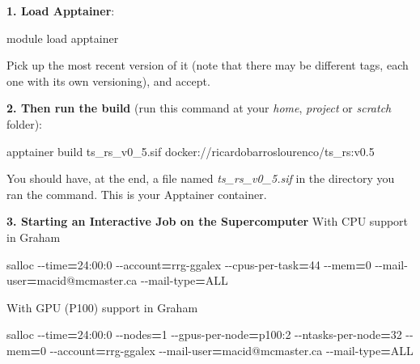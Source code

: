 \documentclass[
]{book}
\newenvironment{Shaded}{\begin{snugshade}}{\end{snugshade}}
\newcommand{\AttributeTok}[1]{\textcolor[rgb]{0.13,0.29,0.53}{#1}}
\newcommand{\ExtensionTok}[1]{#1}
\newcommand{\NormalTok}[1]{#1}
\newcommand{\OperatorTok}[1]{\textcolor[rgb]{0.81,0.36,0.00}{\textbf{#1}}}
\begin{document}
\textbf{1. Load Apptainer}:

\begin{Shaded}
\begin{Highlighting}[]
\ExtensionTok{module}\NormalTok{ load apptainer}
\end{Highlighting}
\end{Shaded}

Pick up the most recent version of it (note that there may be different tags, each one with its own versioning), and accept.

\textbf{2. Then run the build} (run this command at your \emph{home}, \emph{project} or \emph{scratch} folder):

\begin{Shaded}
\begin{Highlighting}[]
\ExtensionTok{apptainer}\NormalTok{ build ts\_rs\_v0\_5.sif docker://ricardobarroslourenco/ts\_rs:v0.5}
\end{Highlighting}
\end{Shaded}

You should have, at the end, a file named \emph{ts\_rs\_v0\_5.sif} in the
directory you ran the command. This is your Apptainer container.

\textbf{3. Starting an Interactive Job on the Supercomputer}
With CPU support in Graham

\begin{Shaded}
\begin{Highlighting}[]
\ExtensionTok{salloc} \AttributeTok{{-}{-}time}\OperatorTok{=}\NormalTok{24:00:0 }\AttributeTok{{-}{-}account}\OperatorTok{=}\NormalTok{rrg{-}ggalex }\AttributeTok{{-}{-}cpus{-}per{-}task}\OperatorTok{=}\NormalTok{44 }\AttributeTok{{-}{-}mem}\OperatorTok{=}\NormalTok{0 }\AttributeTok{{-}{-}mail{-}user}\OperatorTok{=}\NormalTok{macid@mcmaster.ca }\AttributeTok{{-}{-}mail{-}type}\OperatorTok{=}\NormalTok{ALL}
\end{Highlighting}
\end{Shaded}

With GPU (P100) support in Graham

\begin{Shaded}
\begin{Highlighting}[]
\ExtensionTok{salloc} \AttributeTok{{-}{-}time}\OperatorTok{=}\NormalTok{24:00:0 }\AttributeTok{{-}{-}nodes}\OperatorTok{=}\NormalTok{1 }\AttributeTok{{-}{-}gpus{-}per{-}node}\OperatorTok{=}\NormalTok{p100:2 }\AttributeTok{{-}{-}ntasks{-}per{-}node}\OperatorTok{=}\NormalTok{32 }\AttributeTok{{-}{-}mem}\OperatorTok{=}\NormalTok{0 }\AttributeTok{{-}{-}account}\OperatorTok{=}\NormalTok{rrg{-}ggalex }\AttributeTok{{-}{-}mail{-}user}\OperatorTok{=}\NormalTok{macid@mcmaster.ca }\AttributeTok{{-}{-}mail{-}type}\OperatorTok{=}\NormalTok{ALL}
\end{Highlighting}
\end{Shaded}
\end{document}
